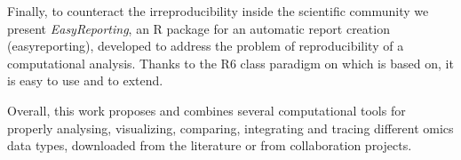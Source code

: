 Finally, to counteract the irreproducibility inside the scientific community we present \textit{EasyReporting}, an R package for an automatic report creation (easyreporting), developed to address the problem of reproducibility of a computational analysis.  
Thanks to the R6 class paradigm on which is based on, it is easy to use and to extend.

Overall, this work proposes and combines several computational tools for properly analysing, visualizing, comparing, integrating and tracing different omics data types, downloaded from the literature or from collaboration projects.
